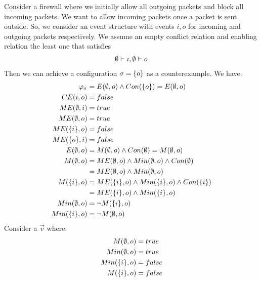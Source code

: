\documentclass{article}
\begin{document}
\begin{example}
    Consider a firewall where we initially allow all outgoing packets and block all incoming packets.
    We want to allow incoming packets once a packet is sent outside.
    So, we consider an event structure with events $i,o$ for incoming and
    outgoing packets respectively.
    We assume an empty conflict relation and enabling relation
    the least one that satisfies
    \begin{align*}
        \emptyset \vdash i, \emptyset \vdash o
    \end{align*}
    Then we can achieve a configuration $\sigma = \{o\}$ as a
    counterexample.
    We have:
    \begin{align*}
        \varphi_{\sigma} & = E(\emptyset, o) \wedge Con(\{o\}) 
        = E(\emptyset, o)
        \\
        CE(i,o)          & = false                                             \\
        ME(\emptyset, i)        & = true                                              \\
        ME(\emptyset, o)        & = true                                              \\
        ME(\{i\}, o)     & = false                                             \\
        ME(\{o\}, i)     & = false                                             \\
        E(\emptyset, o)         & = M(\emptyset,o) \wedge Con(\emptyset) 
        = M(\emptyset, o) \\
        M(\emptyset, o)         & = ME(\emptyset,o) \wedge Min(\emptyset, o)\wedge Con(\emptyset)  \\
        & = ME(\emptyset,o) \wedge Min(\emptyset, o) \\
        M(\{i\},o)       & = ME(\{i\},o) \wedge Min(\{i\},o) \wedge Con(\{i\}) \\
        & = ME(\{i\},o) \wedge Min(\{i\},o) \\
        Min(\emptyset, o)       & = \neg M(\{i\},o) \\
        Min(\{i\},o)     & = \neg M(\emptyset,o)
    \end{align*}
    Consider a $\vec v$ where:
    \begin{align*}
        M(\emptyset, o) & = true \\
        Min(\emptyset, o) & = true \\
        Min(\{i\}, o) & = false \\
        M(\{i\}, o) & = false \\
    \end{align*}

\end{example}
\end{document}
